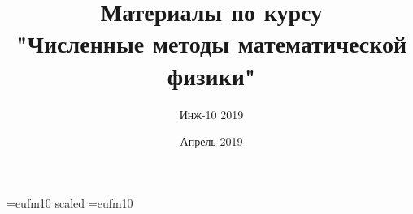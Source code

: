 \documentclass[12pt]{article}
\title{\bf Материалы по курсу \\ "Численные методы математической физики"}
\author{Инж-10 2019}
\date{Апрель 2019}
\begin{document}

\voffset=-30mm
\hoffset=-12mm
\font\Got=eufm10 scaled \font\Got=eufm10

\maketitle
\end{document}
